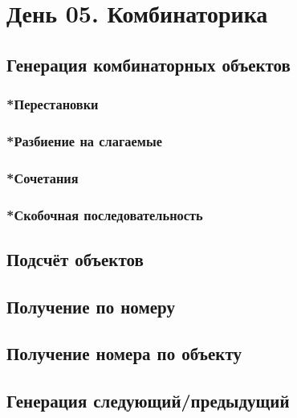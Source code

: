 \documentclass[a4paper,12pt]{article}
\begin{document}
  \section{День 05. Комбинаторика}

    \subsection{Генерация комбинаторных объектов}
      \subsubsection{*Перестановки}
      \subsubsection{*Разбиение на слагаемые}
      \subsubsection{*Сочетания}
      \subsubsection{*Скобочная последовательность}

    \subsection{Подсчёт объектов}

    \subsection{Получение по номеру}

    \subsection{Получение номера по объекту}

    \subsection{Генерация следующий/предыдущий}
\end{document}
